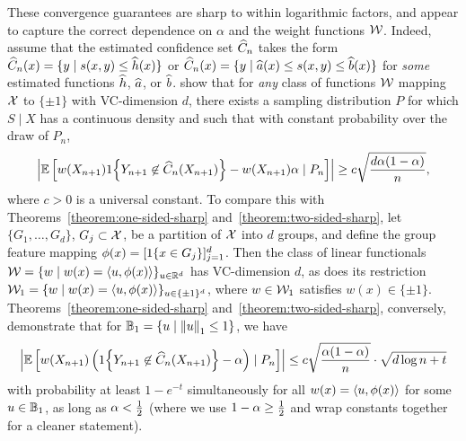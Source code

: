 \documentclass[11pt]{article}
\newcommand{\radphi}{b_{\phi}}
\newcommand{\scorefunc}{s}
\newcommand{\scoreval}{\scorefunc}
\newcommand{\scorerv}{S}
\begin{document}
These convergence guarantees are sharp to within logarithmic factors,
and appear to capture the correct dependence on $\alpha$ and the
weight functions $\mathcal{W}$.
%
Indeed, assume that the estimated
confidence set $\widehat{C}_n$ takes the form
$\what{C}_n(x) = \{y \mid \scoreval(x, y) \le \what{h}(x)\}$ or
$\what{C}_n(x) = \{y \mid \what{a}(x) \le \scoreval(x, y)
\le \what{b}(x)\}$ for \emph{some} estimated functions
$\widehat{h}$, $\widehat{a}$, or $\widehat{b}$.
%
\citet{ArecesChDuKu24} show that for \emph{any} class of functions $\mathcal{W}$
mapping $\mathcal{X}$ to $\{\pm 1\}$ with VC-dimension $d$, there exists a
sampling distribution $P$ for which $\scorerv \mid X$ has a continuous
density and such that with constant probability over the draw of $P_n$,
\begin{equation*}
  \left|\mathbb{E}\left[w(X_{n + 1}) 1\!\left\{Y_{n + 1} \not \in \widehat{C}_n(X_{n+1})\right\}
    - w(X_{n + 1}) \alpha  \mid P_n \right]\right|
  \ge c \sqrt{\frac{d \alpha(1 - \alpha)}{n}},
\end{equation*}
where $c > 0$ is a universal constant.
%
To compare this with Theorems~\ref{theorem:one-sided-sharp}
and~\ref{theorem:two-sided-sharp}, let $\{G_1, \ldots, G_d\}$, $G_j \subset
\mathcal{X}$, be a partition of $\mathcal{X}$ into $d$ groups, and define the group
feature mapping $\phi(x) = [1\!\left\{x \in G_j\right\}]_{j = 1}^d$.
%
Then the class of linear functionals $\mathcal{W} = \{w \mid w(x) = \langle u,
\phi(x)\rangle\}_{u \in \mathbb{R}^d}$ has VC-dimension $d$, as does its restriction
$\mathcal{W}_1 = \{w \mid w(x) = \langle u, \phi(x)\rangle\}_{u \in \{\pm 1\}^d}$, where $w
\in \mathcal{W}_1$ satisfies $w(x) \in \{\pm 1\}$.
%
Theorems~\ref{theorem:one-sided-sharp} and~\ref{theorem:two-sided-sharp},
conversely, demonstrate that for
$\mathbb{B}_1 = \{u \mid \left\|{u}\right\|_1 \le 1\}$,
we have
\begin{equation*}
  \left|\mathbb{E}\left[
      w(X_{n + 1})
      \left(1\!\left\{Y_{n + 1} \not \in \widehat{C}_n(X_{n + 1})\right\}
      - \alpha\right)
      \mid P_n\right]\right|
  \le c \sqrt{\frac{\alpha(1 - \alpha) }{n}}
  \cdot \sqrt{d \log n + t}
\end{equation*}
with probability at least $1 - e^{-t}$ simultaneously for all $w(x) = \langle u,
\phi(x)\rangle$ for some $u \in \mathbb{B}_1$, as long as $\alpha < \frac{1}{2}$ (where we
use $1 - \alpha \ge \frac{1}{2}$ and wrap constants together for a cleaner
statement).


\end{document}
